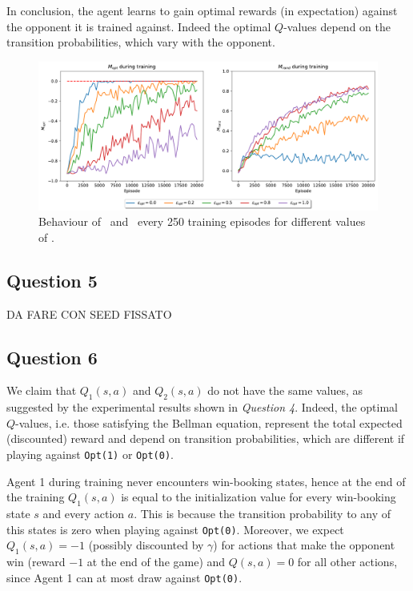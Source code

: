 \documentclass[10pt]{IEEEtran}
\begin{document}
In conclusion, the agent learns to gain optimal rewards (in expectation) against the opponent it is trained against. Indeed the optimal $Q$-values depend on the transition probabilities, which vary with the opponent.

\begin{figure}[H]
    \centering
    \includegraphics[width=\linewidth]{code/figures/performance_epsilon_opt.pdf}
    \caption{Behaviour of \mopt\  and \mrand\  every 250 training episodes for different values of \eopt.}
    \label{plot_question4}
\end{figure}

\subsection*{Question 5}

DA FARE CON SEED FISSATO

\subsection*{Question 6}
We claim that $Q_1(s,a)$ and $Q_2(s,a)$ do not have the same values, as suggested by the experimental results shown in \emph{Question 4}.
Indeed, the optimal $Q$-values, i.e. those satisfying the Bellman equation, represent the total expected (discounted) reward and depend on transition probabilities, which are different if playing against \texttt{Opt(1)} or \texttt{Opt(0)}. 

Agent 1 during training never encounters win-booking states, hence at the end of the training $Q_1(s,a)$ is equal to the initialization value for every win-booking state $s$ and every action $a$. This is because the transition probability to any of this states is zero when playing against \texttt{Opt(0)}. Moreover, we expect $Q_1(s,a) = -1$ (possibly discounted by $\gamma$) for actions that make the opponent win (reward $-1$ at the end of the game) and $Q(s,a) = 0$ for all other actions, since Agent 1 can at most draw against \texttt{Opt(0)}. 
\end{document}
